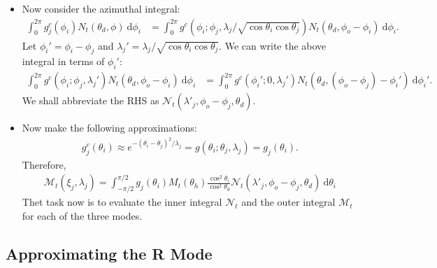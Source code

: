 \documentclass[10pt]{article}
\newcommand{\dee}{\mathrm{d}}
\newcommand{\modeint}{\mathcal{M}}
\newcommand{\azimint}{\mathcal{N}}
\begin{document}
\begin{itemize}
    \item Now consider the azimuthal integral:
    \begin{align*}
      \int_0^{2\pi} g^c_j(\phi_i) N_t(\theta_d, \phi)\ \dee \phi_i
      &= \int_0^{2\pi} g^c(\phi_i; \phi_j, \lambda_j / \sqrt{\cos\theta_i \cos\theta_j}) N_t(\theta_d, \phi_o - \phi_i)\ \dee \phi_i.
    \end{align*}
    Let $\phi_i' = \phi_i - \phi_j$ and $\lambda_j' = \lambda_j / \sqrt{\cos\theta_i \cos\theta_j}$. We can write the above integral in terms of $\phi_i'$:
    \begin{align*}
      \int_0^{2\pi} g^c(\phi_i; \phi_j, \lambda_j') N_t(\theta_d, \phi_o - \phi_i)\ \dee \phi_i
      &= \int_0^{2\pi} g^c(\phi_i'; 0, \lambda_j') N_t(\theta_d, (\phi_o - \phi_j) - \phi_i')\ \dee \phi_i'.
    \end{align*}
    We shall abbreviate the RHS as $\azimint_t(\lambda'_j, \phi_o-\phi_j, \theta_d)$.
    
    \item Now make the following approximations:
    \begin{align*}
      g^c_j(\theta_i) \approx e^{-(\theta_i - \theta_j)^2/\lambda_j} = g(\theta_i; \theta_j, \lambda_j) = g_j(\theta_i).
    \end{align*}
    Therefore,
    \begin{align*}
      \modeint_t(\xi_j, \lambda_j) =  \int_{-\pi/2}^{\pi/2} g_j(\theta_i)  M_t(\theta_h) \frac{\cos^2 \theta_i}{\cos^2 \theta_d} \azimint_t(\lambda'_j, \phi_o-\phi_j, \theta_d) \ \dee \theta_i
    \end{align*}    
    Thet task now is to evaluate the inner integral $\azimint_t$ and the outer integral $\modeint_t$ for each of the three modes.
  \end{itemize}
  
  \subsection{Approximating the R Mode}
  
\end{document}

